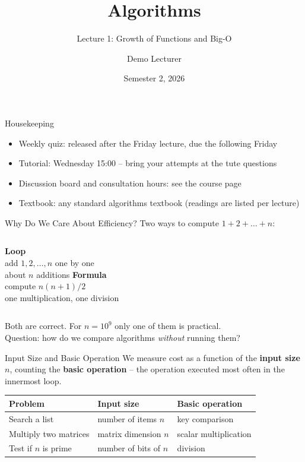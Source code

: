 \documentclass[aspectratio=169,11pt]{beamer}
\title{Algorithms}
\subtitle{Lecture 1: Growth of Functions and Big-O}
\author{Demo Lecturer}
\date{Semester 2, 2026}
\begin{document}
\begin{frame}
  \titlepage
\end{frame}

\begin{frame}{Housekeeping}
  \begin{itemize}
    \item Weekly quiz: released after the Friday lecture, due the following Friday
    \item Tutorial: Wednesday 15:00 -- bring your attempts at the tute questions
    \item Discussion board and consultation hours: see the course page
    \item Textbook: any standard algorithms textbook (readings are listed per lecture)
  \end{itemize}
\end{frame}

\begin{frame}{Why Do We Care About Efficiency?}
  Two ways to compute $1 + 2 + \dots + n$:
  \medskip
  \begin{columns}[T]
    \textbf{Loop}\\[2pt]
    add $1, 2, \dots, n$ one by one\\
    about $n$ additions
    \textbf{Formula}\\[2pt]
    compute $n(n+1)/2$\\
    one multiplication, one division
  \end{columns}
  \bigskip
  Both are correct. For $n = 10^9$ only one of them is practical.\\[4pt]
  \alert{Question:} how do we compare algorithms \emph{without} running them?
\end{frame}

\begin{frame}{Input Size and Basic Operation}
  We measure cost as a function of the \textbf{input size} $n$, counting the
  \textbf{basic operation} -- the operation executed most often in the innermost loop.
  \medskip
  \begin{center}
  \begin{tabular}{lll}
    \hline
    Problem & Input size & Basic operation \\
    \hline
    Search a list & number of items $n$ & key comparison \\
    Multiply two matrices & matrix dimension $n$ & scalar multiplication \\
    Test if $n$ is prime & number of bits of $n$ & division \\
    \hline
  \end{tabular}
  \end{center}
\end{frame}
\end{document}
